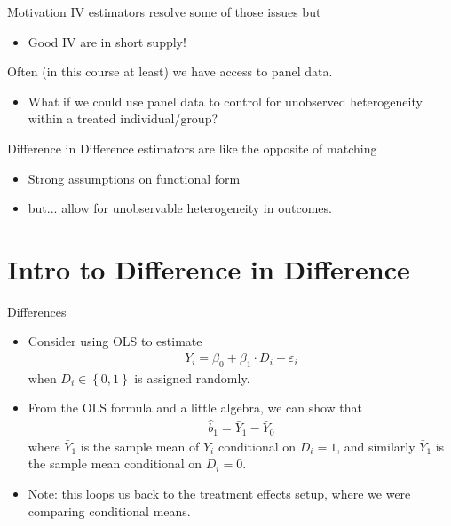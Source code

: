 \documentclass[aspectratio=169,11pt]{beamer}
\begin{document}
\begin{frame}{Motivation}
IV estimators resolve some of those issues but
\begin{itemize}
\item Good IV are in short supply!
\end{itemize}
 Often (in this course at least) we have access to \alert{panel data}.
\begin{itemize}
\item What if we could use panel data to control for \alert{unobserved heterogeneity} within a treated individual/group?
\end{itemize}
\alert{Difference in Difference} estimators are like the opposite of matching
\begin{itemize}
\item \alert{Strong} assumptions on \alert{functional form}
\item but... allow for \alert{unobservable heterogeneity} in outcomes.
\end{itemize}
\end{frame}


\section{Intro to Difference in Difference}


\begin{frame}{Differences}
\begin{itemize}
  \item Consider using OLS to estimate
  \begin{align*}
  Y_{i}=\beta_{0}+\beta_{1}\cdot D_{i}+ \varepsilon_{i}
  \end{align*}
  when $D_i \in \left\{ 0,1\right\}$ is assigned randomly.

  \medskip
  \item From the OLS formula and a little algebra, we can show that
  \begin{align*}
  \hat{b}_1 = \bar{Y}_{1} - \bar{Y}_{0}
  \end{align*}
  where $\bar{Y}_{1}$ is the sample mean of $Y_i$ conditional on
  $D_i = 1$, and similarly $\bar{Y}_{1}$ is the sample mean conditional on $D_i = 0$.

  \medskip
  \item Note: this loops us back to the treatment effects setup, where
  we were comparing conditional means.

\end{itemize}
\end{frame}
\end{document}
